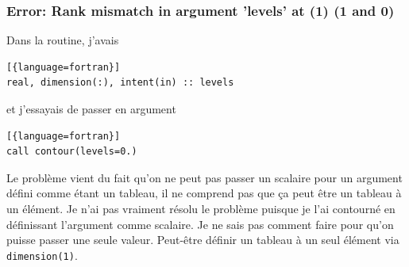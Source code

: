 \documentclass[a4paper,twoside]{article}
\begin{document}
\subsubsection{Error: Rank mismatch in argument 'levels' at (1) (1 and 0)}
Dans la routine, j'avais
\begin{lstlisting}[{language=fortran}]
real, dimension(:), intent(in) :: levels
\end{lstlisting}
et j'essayais de passer en argument
\begin{lstlisting}[{language=fortran}]
call contour(levels=0.)
\end{lstlisting}
Le problème vient du fait qu'on ne peut pas passer un scalaire pour un argument défini comme étant un tableau, il ne comprend pas que ça peut être un tableau à un élément. Je n'ai pas vraiment résolu le problème puisque je l'ai contourné en définissant l'argument comme scalaire. Je ne sais pas comment faire pour qu'on puisse passer une seule valeur. Peut-être définir un tableau à un seul élément via \texttt{dimension(1)}.
\end{document}
